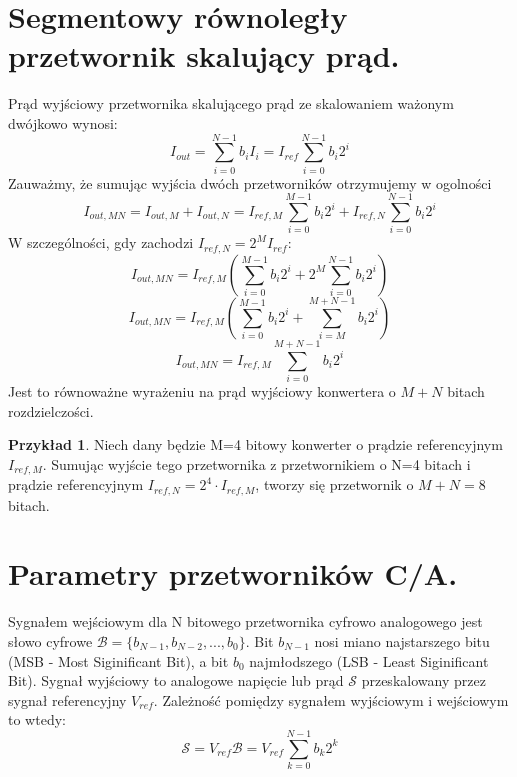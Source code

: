 \documentclass[10pt,a4paper]{report}
\theoremstyle{definition}
\theoremstyle{definition}
\theoremstyle{definition}
\newtheorem{przyklad}{Przykład}[section]
\theoremstyle{definition}
\theoremstyle{definition}
\begin{document}
	\section{Segmentowy równoległy przetwornik skalujący prąd.}
{	Prąd wyjściowy przetwornika skalującego prąd ze skalowaniem ważonym dwójkowo wynosi:
	\begin{equation}
	I_{out} = \sum_{i=0}^{N-1} b_i I_{i} = I_{ref} \sum_{i=0}^{N-1} b_i 2^{i}
	\end{equation}
	Zauważmy, że sumując wyjścia dwóch przetworników otrzymujemy w ogolności
	\begin{equation}
	I_{out,MN} = I_{out,M} + I_{out,N}
	= I_{ref,M} \sum_{i=0}^{M-1} b_i 2^{i} + I_{ref,N} \sum_{i=0}^{N-1} b_i 2^{i}
	\end{equation}
	W szczególności, gdy zachodzi $I_{ref,N} = 2^M I_{ref} $:
	\begin{equation}
	I_{out,MN} = I_{ref,M}\left(\sum_{i=0}^{M-1} b_i 2^{i} + 2^M \sum_{i=0}^{N-1} b_i 2^{i}\right) 
	\end{equation}
	\begin{equation}
	I_{out,MN} = I_{ref,M}\left(\sum_{i=0}^{M-1} b_i 2^{i} + \sum_{i=M}^{M+N-1} b_i 2^{i}\right) 
	\end{equation}
	\begin{equation}
	I_{out,MN} = I_{ref,M} \sum_{i=0}^{M+N-1} b_i 2^{i}
	\end{equation}
	Jest to równoważne wyrażeniu na prąd wyjściowy konwertera o $M+N$ bitach rozdzielczości.
	\begin{przyklad}{Niech dany będzie M=4 bitowy konwerter o prądzie referencyjnym $I_{ref,M}$. Sumując wyjście tego przetwornika z przetwornikiem o N=4 bitach i prądzie referencyjnym $ I_{ref,N} = 2^4 \cdot I_{ref,M} $, tworzy się przetwornik o $M+N=8$ bitach.}
	\end{przyklad}	
}



	\section{Parametry przetworników C/A.}
	{	Sygnałem wejściowym dla N bitowego przetwornika cyfrowo analogowego jest słowo cyfrowe $\mathcal{B}=\{b_{N-1},b_{N-2},...,b_0\}$. Bit $b_{N-1}$ nosi miano najstarszego bitu (MSB - Most Siginificant Bit), a bit $b_0$ najmłodszego (LSB - Least Siginificant Bit). Sygnał wyjściowy to analogowe napięcie lub prąd $\mathcal{S}$ przeskalowany przez sygnał referencyjny $V_{ref}$. Zależność pomiędzy sygnałem wyjściowym i wejściowym to wtedy:
	\begin{equation}
	\mathcal{S} = V_{ref}\mathcal{B} = V_{ref} {\sum_{k=0}^{N-1} b_k2^k}
	\end{equation}	}
	
\end{document}
